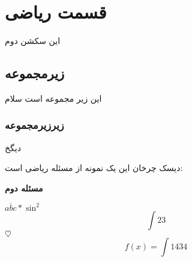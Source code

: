 \section{قسمت ریاضی}
این سکشن دوم

\subsection{زیرمجموعه}
این زیر مجموعه است
سلام

\subsubsection{زیرزیرمجموعه}
دیگخ

دیسک چرخان
این یک نمونه از مسئله ریاضی است:
\begin{mathbox}

\textbf{مسئله دوم}\\


\end{mathbox}

$\overline{abc}*\sin^2$
$$\int{23}$$
$\heartsuit$
$$f(x) = \int{1434}$$